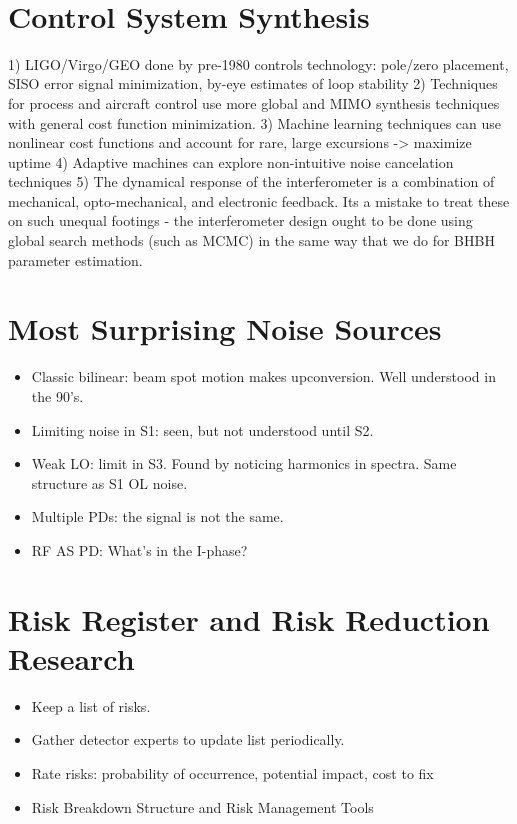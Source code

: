 ​\section{Control System Synthesis}
  1) LIGO/Virgo/GEO done by pre-1980 controls technology: pole/zero placement, SISO error signal minimization, by-eye estimates of loop stability
  2) Techniques for process and aircraft control use more global and MIMO synthesis techniques with general cost function minimization.
  3) Machine learning techniques can use nonlinear cost functions and account for rare, large excursions -> maximize uptime
  4) Adaptive machines can explore non-intuitive noise cancelation techniques​
  5) The dynamical response of the interferometer is a combination of mechanical, opto-mechanical, and electronic feedback. Its a mistake to treat these on such unequal footings - the interferometer design ought to be done using global search methods (such as MCMC) in the same way that we do for BHBH parameter estimation.

\section{Most Surprising Noise Sources}
\begin{itemize}
\item Classic bilinear: beam spot motion makes upconversion. Well understood in the 90's.
\item Limiting noise in S1: seen, but not understood until S2.
\item Weak LO: limit in S3. Found by noticing harmonics in spectra. Same structure as S1 OL noise.
\item Multiple PDs: the signal is not the same.
\item RF AS PD: What's in the I-phase?

\end{itemize}

\section{Risk Register and Risk Reduction Research}
\begin{itemize}
\item Keep a list of risks.
\item Gather detector experts to update list periodically.
\item Rate risks: probability of occurrence, potential impact, cost to fix
\item Risk Breakdown Structure and Risk Management Tools
\end{itemize}

